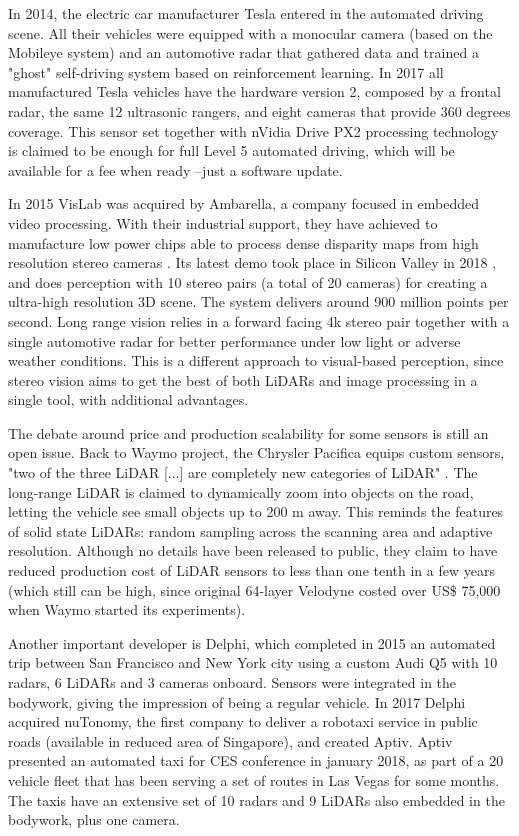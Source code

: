 In 2014, the electric car manufacturer Tesla entered in the automated driving scene. All their vehicles were equipped with a monocular camera (based on the Mobileye system) and an automotive radar that gathered data and trained a "ghost" self-driving system based on reinforcement learning. In 2017 all manufactured Tesla vehicles have the hardware version 2, composed by a frontal radar, the same 12 ultrasonic rangers, and eight cameras that provide 360 degrees coverage. This sensor set together with nVidia Drive PX2 processing technology is claimed to be enough for full Level 5 automated driving, which will be available for a fee when ready --just a software update.

In 2015 VisLab was acquired by Ambarella, a company focused in embedded video 
processing. With their industrial support, they have achieved to manufacture 
low power chips able to process dense disparity maps from high resolution 
stereo cameras \cite{Ambarella2018}. Its latest demo took place in Silicon 
Valley in 2018 \cite{AUVSI2018}, and does perception with 10 stereo pairs (a 
total of 20 cameras) for creating a ultra-high resolution 3D scene. The system
delivers around 900 million points per second.
Long range vision relies in a forward facing 4k stereo pair together with a single automotive radar for better performance under low light or adverse weather conditions. This is a different approach to visual-based perception, since stereo vision aims to get the best of both LiDARs and image processing in a single tool, with additional advantages.

The debate around price and production scalability for some sensors is still an 
open issue. Back to Waymo project, the Chrysler Pacifica equips custom sensors, 
"two of the three LiDAR [...] are completely new categories of LiDAR" 
\cite{Waymoteam2017}. The long-range LiDAR is claimed to dynamically zoom into 
objects on the road, letting the vehicle see small objects up to 200 m away. 
This reminds the features of solid state LiDARs: random sampling across the 
scanning area and adaptive resolution. Although no details have been released 
to public, they claim to have reduced production cost of LiDAR sensors to less 
than one tenth in a few years (which still can be high, since original 64-layer 
Velodyne costed over US\$ 75,000 when Waymo started its experiments).

Another important developer is Delphi, which completed in 2015 an automated
trip between San Francisco and New York city using a custom Audi Q5 with
10 radars, 6 LiDARs and 3 cameras onboard. Sensors were integrated in the
bodywork, giving the impression of being a regular vehicle. In 2017 Delphi
acquired nuTonomy, the first company to deliver a robotaxi service 
in public roads (available in reduced area of Singapore), and created Aptiv. 
Aptiv presented an automated taxi for CES 
conference in january 2018, as part of a 20 vehicle fleet that has been 
serving a set of routes in Las Vegas for some months. The taxis have an
extensive set of 10 radars and 9 LiDARs also embedded in the bodywork, plus
one camera.
